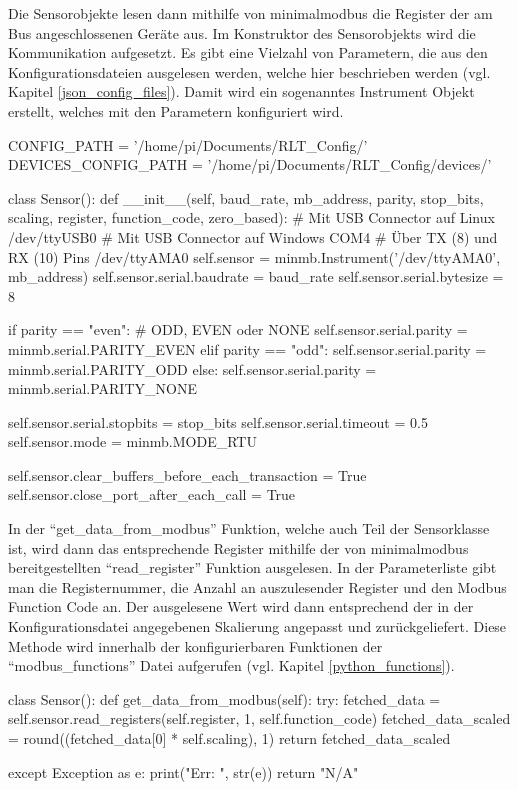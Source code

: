 Die Sensorobjekte lesen dann mithilfe von minimalmodbus die Register der am Bus angeschlossenen Geräte aus. Im Konstruktor des Sensorobjekts wird die Kommunikation aufgesetzt. Es gibt eine Vielzahl von Parametern, die aus den Konfigurationsdateien ausgelesen werden, welche hier beschrieben werden (vgl. Kapitel \ref{json_config_files}). Damit wird ein sogenanntes Instrument Objekt erstellt, welches mit den Parametern konfiguriert wird.

\begin{pythoncode}
CONFIG_PATH = '/home/pi/Documents/RLT_Config/'
DEVICES_CONFIG_PATH = '/home/pi/Documents/RLT_Config/devices/'

class Sensor():
	def __init__(self, baud_rate, mb_address, parity, stop_bits, scaling, register, function_code, zero_based):
        # Mit USB Connector auf Linux       /dev/ttyUSB0
		# Mit USB Connector auf Windows     COM4
		# Über TX (8) und RX (10) Pins      /dev/ttyAMA0
		self.sensor = minmb.Instrument('/dev/ttyAMA0', mb_address)
		self.sensor.serial.baudrate = baud_rate
		self.sensor.serial.bytesize = 8
		
		if parity == "even":  # ODD, EVEN oder NONE
			self.sensor.serial.parity = minmb.serial.PARITY_EVEN
		elif parity == "odd":
			self.sensor.serial.parity = minmb.serial.PARITY_ODD
		else:
			self.sensor.serial.parity = minmb.serial.PARITY_NONE
		
		self.sensor.serial.stopbits = stop_bits
		self.sensor.serial.timeout = 0.5
		self.sensor.mode = minmb.MODE_RTU
		
		self.sensor.clear_buffers_before_each_transaction = True
		self.sensor.close_port_after_each_call = True
\end{pythoncode}

\label{get_data_from_modbus}
In der \enquote{get\_data\_from\_modbus} Funktion, welche auch Teil der Sensorklasse ist, wird dann das entsprechende Register mithilfe der von minimalmodbus bereitgestellten \enquote{read\_register} Funktion ausgelesen. In der Parameterliste gibt man die Registernummer, die Anzahl an auszulesender Register und den Modbus Function Code an. Der ausgelesene Wert wird dann entsprechend der in der Konfigurationsdatei angegebenen Skalierung angepasst und zurückgeliefert. Diese Methode wird innerhalb der konfigurierbaren Funktionen der \enquote{modbus\_functions} Datei aufgerufen (vgl. Kapitel \ref{python_functions}).

\begin{pythoncode}
class Sensor():
	def get_data_from_modbus(self):
		try:
			fetched_data = self.sensor.read_registers(self.register, 1, self.function_code)
			fetched_data_scaled = round((fetched_data[0] * self.scaling), 1)
			return fetched_data_scaled
		
		except Exception as e:
			print("Err: ", str(e))
			return "N/A"
\end{pythoncode}

